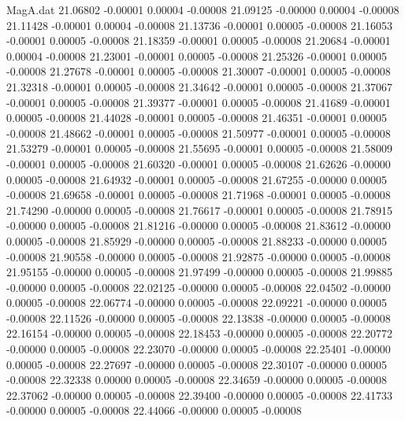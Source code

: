 \begin{filecontents}{MagA.dat}
  21.06802   -0.00001    0.00004   -0.00008
  21.09125   -0.00000    0.00004   -0.00008
  21.11428   -0.00001    0.00004   -0.00008
  21.13736   -0.00001    0.00005   -0.00008
  21.16053   -0.00001    0.00005   -0.00008
  21.18359   -0.00001    0.00005   -0.00008
  21.20684   -0.00001    0.00004   -0.00008
  21.23001   -0.00001    0.00005   -0.00008
  21.25326   -0.00001    0.00005   -0.00008
  21.27678   -0.00001    0.00005   -0.00008
  21.30007   -0.00001    0.00005   -0.00008
  21.32318   -0.00001    0.00005   -0.00008
  21.34642   -0.00001    0.00005   -0.00008
  21.37067   -0.00001    0.00005   -0.00008
  21.39377   -0.00001    0.00005   -0.00008
  21.41689   -0.00001    0.00005   -0.00008
  21.44028   -0.00001    0.00005   -0.00008
  21.46351   -0.00001    0.00005   -0.00008
  21.48662   -0.00001    0.00005   -0.00008
  21.50977   -0.00001    0.00005   -0.00008
  21.53279   -0.00001    0.00005   -0.00008
  21.55695   -0.00001    0.00005   -0.00008
  21.58009   -0.00001    0.00005   -0.00008
  21.60320   -0.00001    0.00005   -0.00008
  21.62626   -0.00000    0.00005   -0.00008
  21.64932   -0.00001    0.00005   -0.00008
  21.67255   -0.00000    0.00005   -0.00008
  21.69658   -0.00001    0.00005   -0.00008
  21.71968   -0.00001    0.00005   -0.00008
  21.74290   -0.00000    0.00005   -0.00008
  21.76617   -0.00001    0.00005   -0.00008
  21.78915   -0.00000    0.00005   -0.00008
  21.81216   -0.00000    0.00005   -0.00008
  21.83612   -0.00000    0.00005   -0.00008
  21.85929   -0.00000    0.00005   -0.00008
  21.88233   -0.00000    0.00005   -0.00008
  21.90558   -0.00000    0.00005   -0.00008
  21.92875   -0.00000    0.00005   -0.00008
  21.95155   -0.00000    0.00005   -0.00008
  21.97499   -0.00000    0.00005   -0.00008
  21.99885   -0.00000    0.00005   -0.00008
  22.02125   -0.00000    0.00005   -0.00008
  22.04502   -0.00000    0.00005   -0.00008
  22.06774   -0.00000    0.00005   -0.00008
  22.09221   -0.00000    0.00005   -0.00008
  22.11526   -0.00000    0.00005   -0.00008
  22.13838   -0.00000    0.00005   -0.00008
  22.16154   -0.00000    0.00005   -0.00008
  22.18453   -0.00000    0.00005   -0.00008
  22.20772   -0.00000    0.00005   -0.00008
  22.23070   -0.00000    0.00005   -0.00008
  22.25401   -0.00000    0.00005   -0.00008
  22.27697   -0.00000    0.00005   -0.00008
  22.30107   -0.00000    0.00005   -0.00008
  22.32338    0.00000    0.00005   -0.00008
  22.34659   -0.00000    0.00005   -0.00008
  22.37062   -0.00000    0.00005   -0.00008
  22.39400   -0.00000    0.00005   -0.00008
  22.41733   -0.00000    0.00005   -0.00008
  22.44066   -0.00000    0.00005   -0.00008

\end{filecontents}
